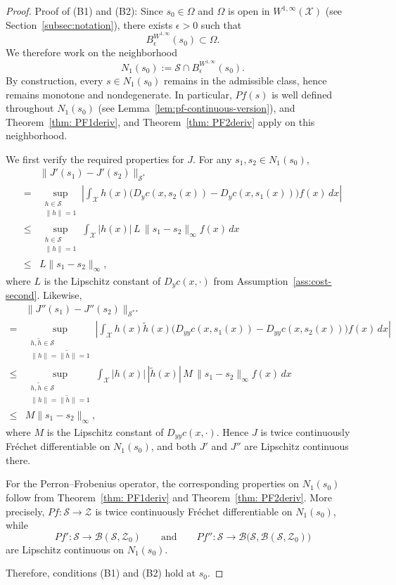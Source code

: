 \documentclass[12pt,leqno]{amsart}
\begin{document}
\begin{proof}
\noindent Proof of (B1) and (B2):
Since \(s_0\in\Omega\) and \(\Omega\) is open in \(W^{1,\infty}(\mathcal{X})\) (see Section~\ref{subsec:notation}), there exists \(\epsilon>0\) such that
\[
B^{W^{1,\infty}}_\epsilon(s_0)\subset \Omega.
\]
We therefore work on the neighborhood
\[
N_1(s_0):=\mathcal{S}\cap B^{W^{1,\infty}}_\epsilon(s_0).
\]
By construction, every \(s\in N_1(s_0)\) remains in the admissible class, hence remains monotone and nondegenerate. In particular, \(Pf(s)\) is well defined throughout \(N_1(s_0)\) (see Lemma~\ref{lem:pf-continuous-version}), and Theorem~\ref{thm: PF1deriv}, and Theorem~\ref{thm: PF2deriv} apply on this neighborhood.

We first verify the required properties for \(J\). For any \(s_1,s_2\in N_1(s_0)\),
\begin{align*}
&\|J'(s_1)-J'(s_2)\|_{\mathcal{S}^*}\\
=& \sup_{\substack{h\in\mathcal{S}\\ \|h\|=1}}
\left|
\int_{\mathcal{X}} h(x)\big(D_yc(x,s_2(x))-D_yc(x,s_1(x))\big)f(x)\,dx
\right|\\
\leq&
\sup_{\substack{h\in\mathcal{S}\\ \|h\|=1}}
\int_{\mathcal{X}} |h(x)|\,L\,\|s_1-s_2\|_\infty f(x)\,dx\\
\leq& L\|s_1-s_2\|_\infty,
\end{align*}
where \(L\) is the Lipschitz constant of \(D_yc(x,\cdot)\) from Assumption~\ref{ass:cost-second}. Likewise,
\begin{align*}
&\|J''(s_1)-J''(s_2)\|_{\mathcal{S}^{**}}\\
=& \sup_{\substack{h,\tilde h\in\mathcal{S}\\ \|h\|=\|\tilde h\|=1}}
\left|
\int_{\mathcal{X}} h(x)\tilde h(x)\big(D_{yy}c(x,s_1(x))-D_{yy}c(x,s_2(x))\big)f(x)\,dx
\right|\\
\leq&
\sup_{\substack{h,\tilde h\in\mathcal{S}\\ \|h\|=\|\tilde h\|=1}}
\int_{\mathcal{X}} |h(x)|\,|\tilde h(x)|\,M\,\|s_1-s_2\|_\infty f(x)\,dx\\
\leq& M\|s_1-s_2\|_\infty,
\end{align*}
where \(M\) is the Lipschitz constant of \(D_{yy}c(x,\cdot)\). Hence \(J\) is twice continuously Fr\'echet differentiable on \(N_1(s_0)\), and both \(J'\) and \(J''\) are Lipschitz continuous there.

For the Perron--Frobenius operator, the corresponding properties on \(N_1(s_0)\) follow from Theorem~\ref{thm: PF1deriv} and Theorem~\ref{thm: PF2deriv}. More precisely, \(Pf:\mathcal{S}\to\mathcal{Z}\) is twice continuously Fr\'echet differentiable on \(N_1(s_0)\), while
\[
Pf':\mathcal{S}\to\mathcal{B}(\mathcal{S},\mathcal{Z}_0)
\qquad\text{and}\qquad
Pf'':\mathcal{S}\to\mathcal{B}\bigl(\mathcal{S},\mathcal{B}(\mathcal{S},\mathcal{Z}_0)\bigr)
\]
are Lipschitz continuous on \(N_1(s_0)\).

Therefore, conditions (B1) and (B2) hold at \(s_0\).
\end{proof}
\end{document}
